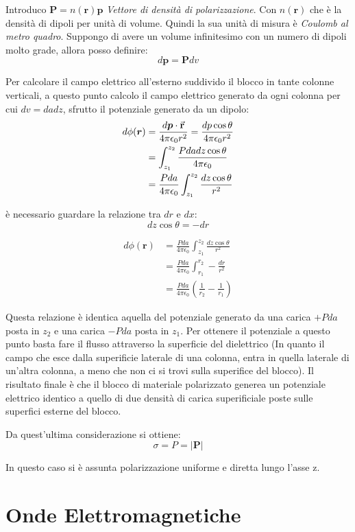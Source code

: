 \documentclass[a4paper]{scrarticle}
\begin{document}
Introduco $\bm P = n(\bm r)\bm p$ \emph{Vettore di densità di polarizzazione}.
Con $n(\bm r)$ che è la densità di dipoli per unità di volume.
Quindi la sua unità di misura è \emph{Coulomb al metro quadro}.
Suppongo di avere un volume infinitesimo con un numero di dipoli molto grade, allora posso definire:
\begin{equation*}
    d\bm p = \bm P dv
\end{equation*}

Per calcolare il campo elettrico all'esterno suddivido il blocco in tante colonne verticali, a questo punto calcolo il campo elettrico generato da ogni colonna per cui $dv = da dz$, sfrutto il potenziale generato da un dipolo:
\begin{align*}
    d\phi(\bm r) &= \frac{d\bm p \cdot \va r}{4\pi\epsilon_0r^2}= \frac{dp\cos\theta}{4\pi\epsilon_0r^2}\\
    &= \int_{z_1}^{z_2}\frac{Pdadz\cos \theta}{4\pi\epsilon_0}\\
    &= \frac{Pda}{4\pi\epsilon_0}\int_{z_1}^{z_2}\frac{dz \cos \theta}{r^2}
\end{align*}

è necessario guardare la relazione tra $dr$ e $dx$:
\begin{equation*}
    dz \cos \theta = -dr
\end{equation*}

\begin{align*}
    d\phi(\bm r) &= \frac{Pda}{4\pi\epsilon_0} \int_{z_1}^{z_2}\frac{dz\cos\theta}{r^2}\\
    &= \frac{Pda}{4\pi\epsilon_0} \int_{r_1}^{r_2} - \frac{dr}{r^2}\\
    &= \frac{Pda}{4\pi\epsilon_0} (\frac{1}{r_2}- \frac{1}{r_1})
\end{align*}

Questa relazione è identica  aquella del potenziale generato da una carica $+Pda$ posta in $z_2$ e una carica $-Pda$ posta in $z_1$.
Per ottenere il potenziale a questo punto basta fare il flusso attraverso la superficie del dielettrico (In quanto il campo che esce dalla superificie laterale di una colonna, entra in quella laterale di un'altra colonna, a meno che non ci si trovi sulla superifice del blocco).
Il risultato finale è che il blocco di materiale polarizzato generea un potenziale elettrico identico a quello di due densità di carica superificiale poste sulle superfici esterne del blocco.

Da quest'ultima considerazione si ottiene:
\begin{equation}
    \sigma  = P = |\bm P|
\end{equation}

In questo caso si è assunta polarizzazione uniforme e diretta lungo l'asse z.


\section{Onde Elettromagnetiche}
\end{document}
